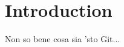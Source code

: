 \documentclass[10pt,twocolumn]{article}
\begin{document}
\section{Introduction}
Non so bene cosa sia 'sto Git...
\end{document}
